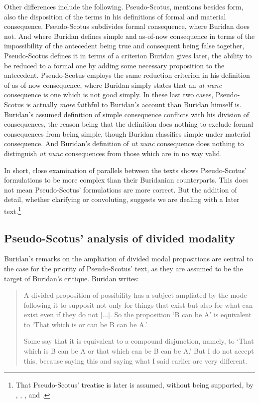	Other differences include the following. Pseudo-Scotus, mentions besides form, also the disposition of the terms in his definitions of formal and material consequence. Pseudo-Scotus subdivides formal consequence, where Buridan does not. And where Buridan defines simple and as-of-now consequence in terms of the impossibility of the antecedent being true and consequent being false together, Pseudo-Scotus defines it in terms of a criterion Buridan gives later, the ability to be reduced to a formal one by adding some necessary proposition to the antecedent. Pseudo-Scotus employs the same reduction criterion in his definition of as-of-now consequence, where Buridan simply states that an \textit{ut nunc} consequence is one which is not good simply. In these last two cases, Pseudo-Scotus is actually \textit{more} faithful to Buridan's account than Buridan himself is. Buridan's assumed definition of simple consequence conflicts with his division of consequences, the reason being that the definition does nothing to exclude formal consequences from being simple, though Buridan classifies simple under material consequence. And Buridan's definition of \textit{ut nunc} consequence does nothing to distinguish \textit{ut nunc} consequences from those which are in no way valid.
	
	In short, close examination of parallels between the texts shows Pseudo-Scotus' formulations to be more complex than their Buridanian counterparts. This does not mean Pseudo-Scotus' formulations are more correct. But the addition of detail, whether clarifying or convoluting, suggests we are dealing with a later text.\footnote{That Pseudo-Scotus' treatise is later is assumed, without being supported, by \cite{Boh1982}, \cite{King2001}, \cite{DutilhNovaes2008}, and \cite{Knuuttila2008}.} 
	
	\subsection{Pseudo-Scotus' analysis of divided modality}
	Buridan's remarks on the ampliation of divided modal propositions are central to the case for the priority of Pseudo-Scotus' text, as they are assumed to be the target of Buridan's critique. Buridan writes: 
	
	\begin{quote}
		A divided proposition of possibility has a subject ampliated by the mode following it to supposit not only for things that exist but also for what can exist even if they do not [...]. So the proposition `B can be A' is equivalent to `That which is or can be B can be A.'
		
		Some say that it is equivalent to a compound disjunction, namely, to `That which is B can be A or that which can be B can be A.' But I do not accept this, because saying this and saying what I said earlier are very different. \cite[II. 4, p. 97]{Buridan2015}
	\end{quote}
	
